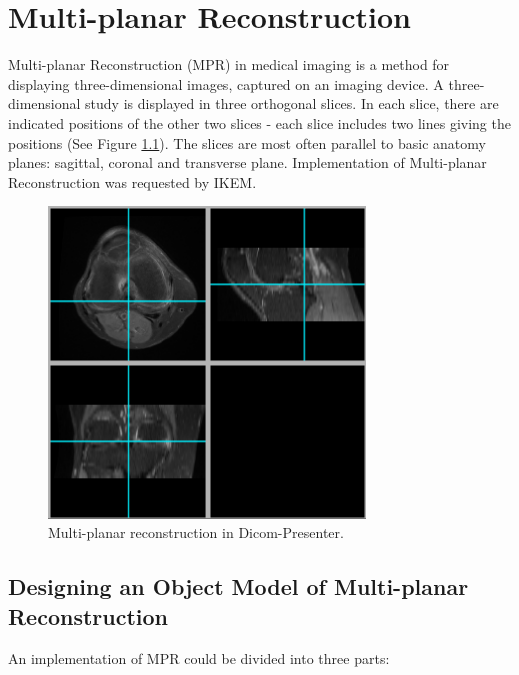 \chapter{Multi-planar Reconstruction}
\vspace{-10mm}
\label{multiplanar}



Multi-planar Reconstruction (MPR) in medical imaging is a method for displaying three-dimensional images, captured on an imaging device. A three-dimensional study is displayed in three orthogonal slices. In each slice, there are indicated positions of the other two slices - each slice includes two lines giving the positions (See Figure \ref{fig:multiplanar}). The slices are most often parallel to basic anatomy planes\cite{ctteachingmanual}: sagittal, coronal and transverse plane.  Implementation of Multi-planar Reconstruction was requested by IKEM.

\begin{figure}
 	\caption{Multi-planar reconstruction in Dicom-Presenter.\label{fig:multiplanar}}
	\begin{center}
	\includegraphics[width=0.75\textwidth]{Text/IMG/MultiPlanar.png}
	\end{center}
\end{figure}

\section{Designing an Object Model of Multi-planar Reconstruction}

An implementation of MPR could be divided into three parts:

